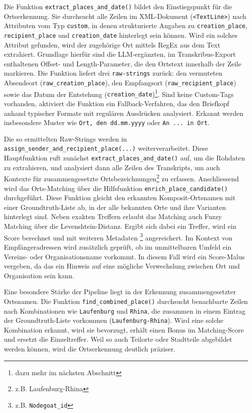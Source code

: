 \documentclass[12pt, a4paper, ngerman, bidi=default]{article}
\newcommand{\code}[1]{\colorbox{VeryLightGray}{\texttt{#1}}} %
\begin{document}
Die Funktion \code{extract\_places\_and\_date()} bildet den Einstiegspunkt für die Ortserkennung. Sie durchsucht alle Zeilen im XML-Dokument (\code{<TextLine>}) nach Attributen vom Typ \texttt{custom}, in denen strukturierte Angaben zu \code{creation\_place}, \code{recipient\_place} und \code{creation\_date} hinterlegt sein können. Wird ein solches Attribut gefunden, wird der zugehörige Ort mittels RegEx aus dem Text extrahiert. Grundlage hierfür sind die LLM-ergänzten, im Transkribus-Export enthaltenen Offset- und Length-Parameter, die den Ortstext innerhalb der Zeile markieren. Die Funktion liefert drei \code{raw-strings} zurück: den vermuteten Absendeort (\code{raw\_creation\_place}), den Empfangsort (\code{raw\_recipient\_place}) sowie das Datum der Entstehung (\code{creation\_date})\footnote{dazu mehr im nächsten Abschnitt}. Sind keine Custom-Tags vorhanden, aktiviert die Funktion ein Fallback-Verfahren, das den Briefkopf anhand typischer Formate mit regulären Ausdrücken analysiert. Erkannt werden insbesondere Muster wie \texttt{Ort, den dd.mm.yyyy} oder \texttt{An ... in Ort}.

Die so ermittelten Raw-Strings werden in \code{assign\_sender\_and\_recipient\_place(...)} weiterverarbeitet. Diese Hauptfunktion ruft zunächst \code{extract\_places\_and\_date()} auf, um die Rohdaten zu extrahieren, und analysiert dann alle Zeilen des Transkripts, um auch Kontexte für zusammengesetzte Ortsbezeichnungen\footnote{z.B. Laufenburg-Rhina} zu erfassen. Anschliessend wird das Orts-Matching über die Hilfsfunktion \code{enrich\_place\_candidate()} durchgeführt. Diese Funktion gleicht den erkannten Komposit-Ortsnamen mit einer Groundtruth-Liste ab, in der alle bekannten Orte und ihre Varianten hinterlegt sind. Neben exakten Treffern erlaubt das Matching auch Fuzzy Matching über die Levenshtein-Distanz. Ergibt sich dabei ein Treffer, wird ein Score berechnet und mit weiteren Metadaten \footnote{z.B. \code{Nodegoat\_id}} angereichert. Im Kontext von Empfängeradressen wird zusätzlich geprüft, ob im unmittelbaren Umfeld ein Vereins- oder Organisationsname vorkommt. In diesem Fall wird ein Score-Malus vergeben, da das ein Hinweis auf eine mögliche Verwechslung zwischen Ort und Organisation sein kann.

Eine besondere Stärke der Pipeline liegt in der Erkennung zusammengesetzter Ortsnamen. Die Funktion \code{find\_combined\_place()} durchsucht benachbarte Zeilen nach Kombinationen wie \texttt{Laufenburg} und \texttt{Rhina}, die zusammen in einem Eintrag der Groundtruth-Liste vorkommen (\texttt{Laufenburg-Rhina}). Wird eine solche Kombination erkannt, wird sie bevorzugt, erhält einen Bonus im Matching-Score und ersetzt die Einzeltreffer. Weil so auch Teilorte oder Stadtteile abgebildet werden können, wird die Ortserkennung deutlich präziser.
\end{document}
